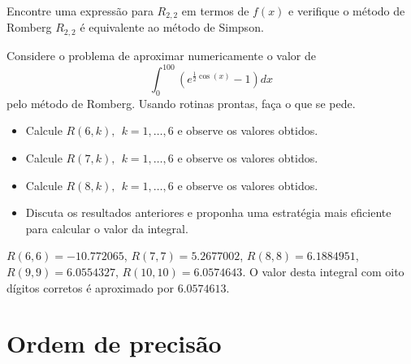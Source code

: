 \begin{exer}
Encontre uma expressão para $R_{2,2}$ em termos de $f(x)$ e verifique o método de Romberg $R_{2,2}$ é equivalente ao método de Simpson.
\end{exer}

\begin{exer}
Considere o problema de aproximar numericamente o valor de
$$\int_0^{100} \left(e^{\frac{1}{2}\cos(x)}-1\right)dx$$
pelo método de Romberg. Usando rotinas prontas, faça o que se pede.
\begin{itemize}
\item Calcule $R(6,k),~~ k=1,\ldots,6$ e observe os valores obtidos.
\item Calcule $R(7,k),~~ k=1,\ldots,6$ e observe os valores obtidos.
\item Calcule $R(8,k),~~ k=1,\ldots,6$ e observe os valores obtidos.
\item Discuta os resultados anteriores e proponha uma estratégia mais eficiente para calcular o valor da integral.
\end{itemize}
\end{exer}
\begin{resp}
  
 $R(6,6)=- 10.772065$, $R(7,7)=5.2677002$, $R(8,8)=6.1884951$, $R(9,9)=6.0554327$, $R(10,10)=6.0574643$. O valor desta integral com oito dígitos corretos é aproximado por  $6.0574613$.      
  
\end{resp}

\section{Ordem de precisão}

